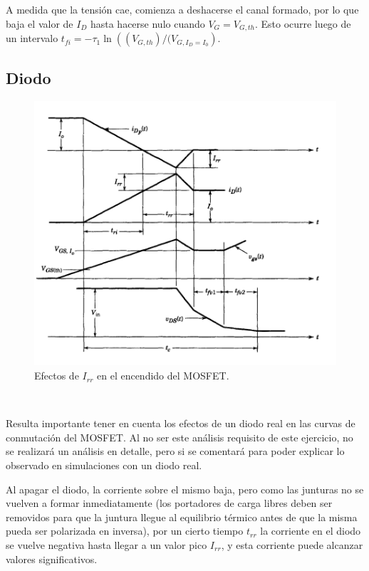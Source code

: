 \documentclass[e4_tp1_main.tex]{subfiles}
\begin{document}
A medida que la tensión cae, comienza a deshacerse el canal formado, por lo que baja el valor de $I_D$ hasta hacerse nulo cuando $V_G=V_{G,th}$. Esto ocurre luego de un intervalo $t_{fi}= -\tau_1\ln\left((V_{G,th})/(V_{G,I_D=I_0}\right)$.

\subsection{Diodo}
\begin{figure}
  \centering
  \includegraphics[width=\linewidth]{images/ej1/diode_irr.png}
  \caption{Efectos de $I_{rr}$ en el encendido del MOSFET.}
  \label{fig:mosfet_irr}
\end{figure}
$ $ %

Resulta importante tener en cuenta los efectos de un diodo real en las curvas de conmutación del MOSFET. Al no ser este análisis requisito de este ejercicio, no se realizará un análisis en detalle, pero si se comentará para poder explicar lo observado en simulaciones con un diodo real.

Al apagar el diodo, la corriente sobre el mismo baja, pero como las junturas no se vuelven a formar inmediatamente (los portadores de carga libres deben ser removidos para que la juntura llegue al equilibrio térmico antes de que la misma pueda ser polarizada en inversa), por un cierto tiempo $t_{rr}$ la corriente en el diodo se vuelve negativa hasta llegar a un valor pico $I_{rr}$, y esta corriente puede alcanzar valores significativos.
\end{document}
